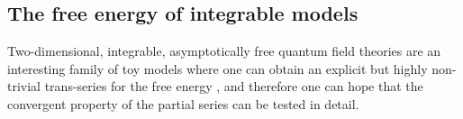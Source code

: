 \documentclass[a4paper,11pt]{article}
\theoremstyle{definition}
\begin{document}
\subsection{The free energy of integrable models}

Two-dimensional, integrable, asymptotically free quantum field theories are an interesting family of toy 
models where one can obtain an explicit but highly non-trivial trans-series 
for the free energy \cite{fkw-letter,fkw, volin, mr-ren, abbh1, 
abbh2, mmr, dmss, mmr-an, bbv, bbhv, 
bbhv2, mmr-theta, bbv2,s-thompson}, and therefore one can hope that the 
convergent property of the partial series can be 
tested in detail. 

\end{document}
